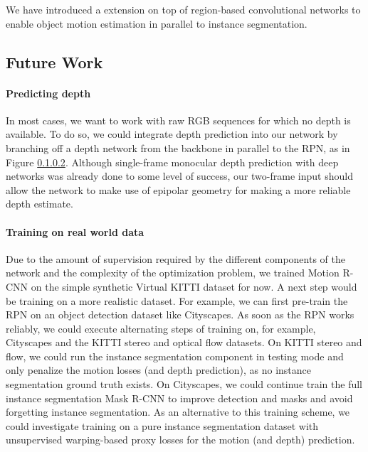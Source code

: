 We have introduced a extension on top of region-based convolutional networks to enable object motion estimation
in parallel to instance segmentation.

\subsection{Future Work}
\paragraph{Predicting depth}
In most cases, we want to work with raw RGB sequences for which no depth is available.
To do so, we could integrate depth prediction into our network by branching off a
depth network from the backbone in parallel to the RPN, as in Figure \ref{}.
Although single-frame monocular depth prediction with deep networks was already done
to some level of success,
our two-frame input should allow the network to make use of epipolar
geometry for making a more reliable depth estimate.

\paragraph{Training on real world data}
Due to the amount of supervision required by the different components of the network
and the complexity of the optimization problem,
we trained Motion R-CNN on the simple synthetic Virtual KITTI dataset for now.
A next step would be training on a more realistic dataset.
For example, we can first pre-train the RPN on an object detection dataset like
Cityscapes. As soon as the RPN works reliably, we could execute alternating
steps of training on, for example, Cityscapes and the KITTI stereo and optical flow datasets.
On KITTI stereo and flow, we could run the instance segmentation component in testing mode and only penalize
the motion losses (and depth prediction), as no instance segmentation ground truth exists.
On Cityscapes, we could continue train the full instance segmentation Mask R-CNN to
improve detection and masks and avoid forgetting instance segmentation.
As an alternative to this training scheme, we could investigate training on a pure
instance segmentation dataset with unsupervised warping-based proxy losses for the motion (and depth) prediction.
